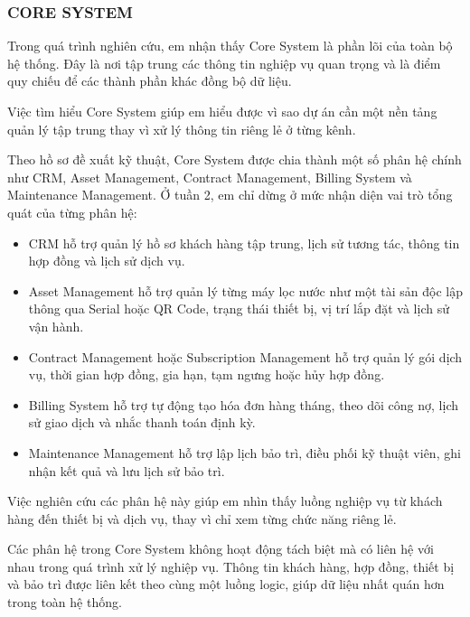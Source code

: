 \subsubsection{CORE SYSTEM}


Trong quá trình nghiên cứu, em nhận thấy Core System là phần lõi của toàn bộ hệ thống. Đây là nơi tập trung các thông tin nghiệp vụ quan trọng và là điểm quy chiếu để các thành phần khác đồng bộ dữ liệu.

Việc tìm hiểu Core System giúp em hiểu được vì sao dự án cần một nền tảng quản lý tập trung thay vì xử lý thông tin riêng lẻ ở từng kênh.


Theo hồ sơ đề xuất kỹ thuật, Core System được chia thành một số phân hệ chính như CRM, Asset Management, Contract Management, Billing System và Maintenance Management. Ở tuần 2, em chỉ dừng ở mức nhận diện vai trò tổng quát của từng phân hệ:

\begin{itemize}
    \item CRM hỗ trợ quản lý hồ sơ khách hàng tập trung, lịch sử tương tác, thông tin hợp đồng và lịch sử dịch vụ.
    \item Asset Management hỗ trợ quản lý từng máy lọc nước như một tài sản độc lập thông qua Serial hoặc QR Code, trạng thái thiết bị, vị trí lắp đặt và lịch sử vận hành.
    \item Contract Management hoặc Subscription Management hỗ trợ quản lý gói dịch vụ, thời gian hợp đồng, gia hạn, tạm ngưng hoặc hủy hợp đồng.
    \item Billing System hỗ trợ tự động tạo hóa đơn hàng tháng, theo dõi công nợ, lịch sử giao dịch và nhắc thanh toán định kỳ.
    \item Maintenance Management hỗ trợ lập lịch bảo trì, điều phối kỹ thuật viên, ghi nhận kết quả và lưu lịch sử bảo trì.
\end{itemize}

Việc nghiên cứu các phân hệ này giúp em nhìn thấy luồng nghiệp vụ từ khách hàng đến thiết bị và dịch vụ, thay vì chỉ xem từng chức năng riêng lẻ.


Các phân hệ trong Core System không hoạt động tách biệt mà có liên hệ với nhau trong quá trình xử lý nghiệp vụ. Thông tin khách hàng, hợp đồng, thiết bị và bảo trì được liên kết theo cùng một luồng logic, giúp dữ liệu nhất quán hơn trong toàn hệ thống.

